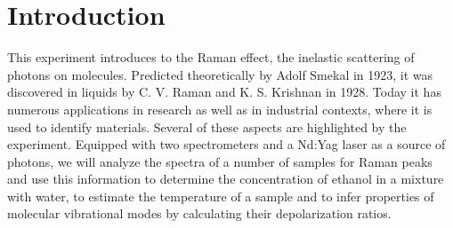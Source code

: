 \section{Introduction}
This experiment introduces to the Raman effect, the inelastic scattering of photons on molecules. Predicted theoretically 
by Adolf Smekal in 1923, it was discovered in liquids by C. V. Raman and K. S. Krishnan in 1928.\cite{venkataraman} 
Today it has numerous applications in research as well as in industrial contexts, where it is used to identify materials. 
Several of these aspects are highlighted by the experiment. Equipped with two spectrometers and a Nd:Yag laser as a source
of photons, we will analyze the spectra of a number of samples for Raman peaks and use this information to determine the 
concentration of ethanol in a mixture with water, to estimate the temperature of a sample and to infer properties of 
molecular vibrational modes by calculating their depolarization ratios. 
